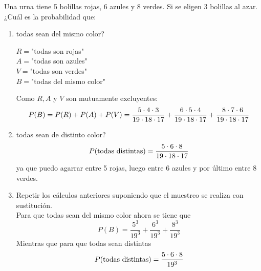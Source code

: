 \item Una urna tiene 5 bolillas rojas, 6 azules y 8 verdes. Si se eligen 3 bolillas al azar. ¿Cuál es la probabilidad que:
    \begin{enumerate}
        \item todas sean del mismo color?
            \begin{center}
                $R=$"todas son rojas"\\
                $A=$"todas son azules"\\
                $V=$"todas son verdes"\\
                $B=$"todas del mismo color"
            \end{center}
            Como $R,A$ y $V$ son mutuamente excluyentes:\[P(B)=P(R)+P(A)+P(V)=\frac{5\cdot4\cdot3}{19\cdot18\cdot17}+\frac{6\cdot5\cdot4}{19\cdot18\cdot17}+\frac{8\cdot7\cdot6}{19\cdot18\cdot17}\]
        \item todas sean de distinto color?
            \[P(\text{todas distintas})=\frac{5\cdot6\cdot8}{19\cdot18\cdot17}\]
            ya que puedo agarrar entre 5 rojas, luego entre 6 azules y por último entre 8 verdes.
        \item Repetir los cálculos anteriores suponiendo que el muestreo se realiza con sustitución.\e\\
            Para que todas sean del mismo color ahora se tiene que \[P(B)=\frac{5^3}{19^3}+\frac{6^3}{19^3}+\frac{8^3}{19^3}\]
            Mientras que para que todas sean distintas\[P(\text{todas distintas})=\frac{5\cdot6\cdot8}{19^3}\]
    \end{enumerate}